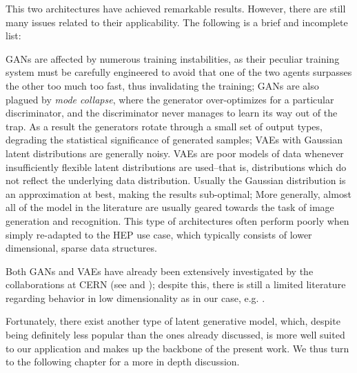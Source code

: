 This two architectures have achieved remarkable results. However, there are still many issues related to their applicability. The following is a brief and incomplete list:

\begin{outline}
    \1 GANs are affected by numerous training instabilities, as their peculiar training system must be carefully engineered to avoid that one of the two agents surpasses the other too much too fast, thus invalidating the training;
    \1 GANs are also plagued by  \emph{mode collapse}, where the generator over-optimizes for a particular discriminator, and the discriminator never manages to learn its way out of the trap. As a result the generators rotate through a small set of output types, degrading the statistical significance of generated samples;
    \1 VAEs with Gaussian latent distributions are generally noisy. VAEs are poor models of data whenever insufficiently flexible latent distributions are used--that is, distributions which do not reflect the underlying data distribution. Usually the Gaussian distribution is an approximation at best, making the results sub-optimal;
    \1 More generally, almost all of the model in the literature are usually geared towards the task of image generation and recognition. This type of architectures often perform poorly when simply re-adapted to the HEP use case, which typically consists of lower dimensional, sparse data structures. 
\end{outline}

Both GANs and VAEs have already been extensively investigated by the collaborations at CERN (see \cite{2019glhc} and \cite{otten2021event}); despite this, there is still a limited literature regarding behavior in low dimensionality as in our case, e.g. \cite{523096}.

Fortunately, there exist another type of latent generative model, which, despite being definitely less popular than the ones already discussed, is more well suited to our application and makes up the backbone of the present work. We thus turn to the following chapter for a more in depth discussion.

